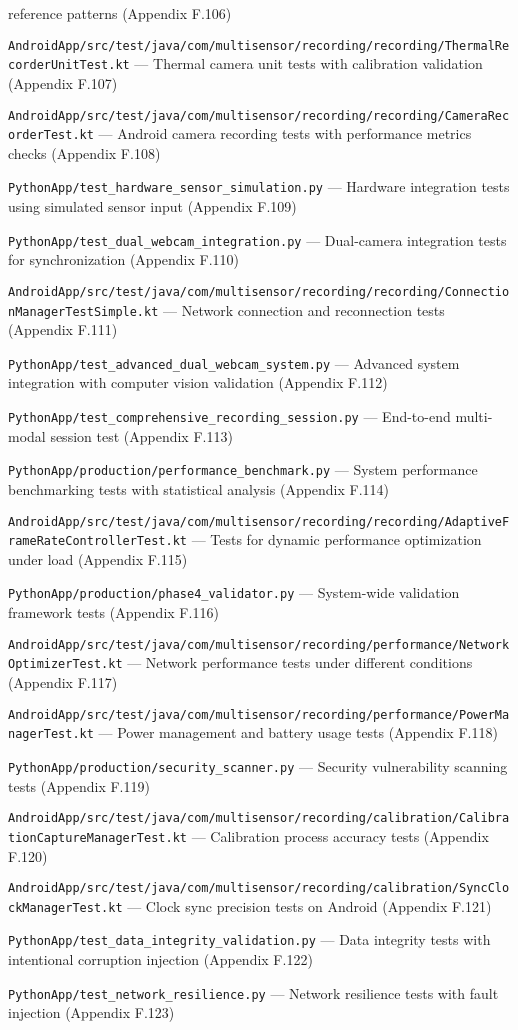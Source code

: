reference patterns (Appendix F.106) \item \texttt{AndroidApp/src/test/java/com/multisensor/recording/recording/ThermalRecorderUnitTest.kt} --- Thermal camera unit tests with calibration validation (Appendix F.107) \item \texttt{AndroidApp/src/test/java/com/multisensor/recording/recording/CameraRecorderTest.kt} --- Android camera recording tests with performance metrics checks (Appendix F.108) \item \texttt{PythonApp/test_hardware_sensor_simulation.py} --- Hardware integration tests using simulated sensor input (Appendix F.109) \item \texttt{PythonApp/test_dual_webcam_integration.py} --- Dual-camera integration tests for synchronization (Appendix F.110) \item \texttt{AndroidApp/src/test/java/com/multisensor/recording/recording/ConnectionManagerTestSimple.kt} --- Network connection and reconnection tests (Appendix F.111) \item \texttt{PythonApp/test_advanced_dual_webcam_system.py} --- Advanced system integration with computer vision validation (Appendix F.112) \item \texttt{PythonApp/test_comprehensive_recording_session.py} --- End-to-end multi-modal session test (Appendix F.113) \item \texttt{PythonApp/production/performance_benchmark.py} --- System performance benchmarking tests with statistical analysis (Appendix F.114) \item \texttt{AndroidApp/src/test/java/com/multisensor/recording/recording/AdaptiveFrameRateControllerTest.kt} --- Tests for dynamic performance optimization under load (Appendix F.115) \item \texttt{PythonApp/production/phase4_validator.py} --- System-wide validation framework tests (Appendix F.116) \item \texttt{AndroidApp/src/test/java/com/multisensor/recording/performance/NetworkOptimizerTest.kt} --- Network performance tests under different conditions (Appendix F.117) \item \texttt{AndroidApp/src/test/java/com/multisensor/recording/performance/PowerManagerTest.kt} --- Power management and battery usage tests (Appendix F.118) \item \texttt{PythonApp/production/security_scanner.py} --- Security vulnerability scanning tests (Appendix F.119) \item \texttt{AndroidApp/src/test/java/com/multisensor/recording/calibration/CalibrationCaptureManagerTest.kt} --- Calibration process accuracy tests (Appendix F.120) \item \texttt{AndroidApp/src/test/java/com/multisensor/recording/calibration/SyncClockManagerTest.kt} --- Clock sync precision tests on Android (Appendix F.121) \item \texttt{PythonApp/test_data_integrity_validation.py} --- Data integrity tests with intentional corruption injection (Appendix F.122) \item \texttt{PythonApp/test_network_resilience.py} --- Network resilience tests with fault injection (Appendix F.123) \item 